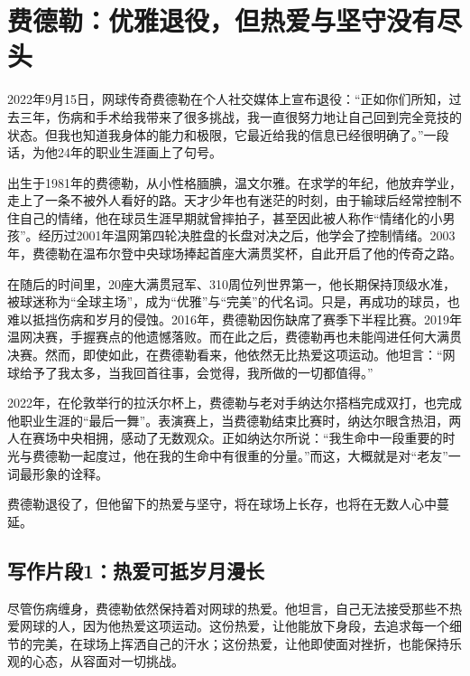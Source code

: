 
\section*{费德勒：优雅退役，但热爱与坚守没有尽头}

2022年9月15日，网球传奇费德勒在个人社交媒体上宣布退役：“正如你们所知，过去三年，伤病和手术给我带来了很多挑战，我一直很努力地让自己回到完全竞技的状态。但我也知道我身体的能力和极限，它最近给我的信息已经很明确了。”一段话，为他24年的职业生涯画上了句号。

出生于1981年的费德勒，从小性格腼腆，温文尔雅。在求学的年纪，他放弃学业，走上了一条不被外人看好的路。天才少年也有迷茫的时刻，由于输球后经常控制不住自己的情绪，他在球员生涯早期就曾摔拍子，甚至因此被人称作“情绪化的小男孩”。经历过2001年温网第四轮决胜盘的长盘对决之后，他学会了控制情绪。2003年，费德勒在温布尔登中央球场捧起首座大满贯奖杯，自此开启了他的传奇之路。

在随后的时间里，20座大满贯冠军、310周位列世界第一，他长期保持顶级水准，被球迷称为“全球主场”，成为“优雅”与“完美”的代名词。只是，再成功的球员，也难以抵挡伤病和岁月的侵蚀。2016年，费德勒因伤缺席了赛季下半程比赛。2019年温网决赛，手握赛点的他遗憾落败。而在此之后，费德勒再也未能闯进任何大满贯决赛。然而，即使如此，在费德勒看来，他依然无比热爱这项运动。他坦言：“网球给予了我太多，当我回首往事，会觉得，我所做的一切都值得。”

2022年，在伦敦举行的拉沃尔杯上，费德勒与老对手纳达尔搭档完成双打，也完成他职业生涯的“最后一舞”。表演赛上，当费德勒结束比赛时，纳达尔眼含热泪，两人在赛场中央相拥，感动了无数观众。正如纳达尔所说：“我生命中一段重要的时光与费德勒一起度过，他在我的生命中有很重的分量。”而这，大概就是对“老友”一词最形象的诠释。

费德勒退役了，但他留下的热爱与坚守，将在球场上长存，也将在无数人心中蔓延。

\subsection*{写作片段1：热爱可抵岁月漫长}

尽管伤病缠身，费德勒依然保持着对网球的热爱。他坦言，自己无法接受那些不热爱网球的人，因为他热爱这项运动。这份热爱，让他能放下身段，去追求每一个细节的完美，在球场上挥洒自己的汗水；这份热爱，让他即使面对挫折，也能保持乐观的心态，从容面对一切挑战。

